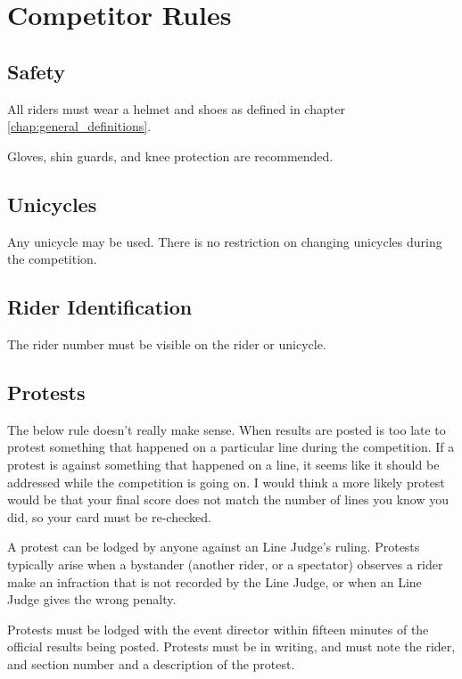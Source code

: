 \chapter{Competitor Rules}

\section{Safety}

All riders must wear a helmet and shoes as defined in chapter \ref{chap:general_definitions}.

Gloves, shin guards, and knee protection are recommended.

\section{Unicycles}

Any unicycle may be used.
There is no restriction on changing unicycles during the competition.

\section{Rider Identification}

The rider number must be visible on the rider or unicycle.

\section{Protests}

\begin{comment2016}
The below rule doesn't really make sense.
When results are posted is too late to protest something that happened on a particular line during the competition.
If a protest is against something that happened on a line, it seems like it should be addressed while the competition is going on.
I would think a more likely protest would be that your final score does not match the number of lines you know you did, so your card must be re-checked.
\end{comment2016}

A protest can be lodged by anyone against an Line Judge's ruling.
Protests typically arise when a bystander (another rider, or a spectator) observes a rider make an infraction that is not recorded by the Line Judge, or when an Line Judge gives the wrong penalty.

Protests must be lodged with the event director within fifteen minutes of the official results being posted.
Protests must be in writing, and must note the rider, and section number and a description of the protest.

